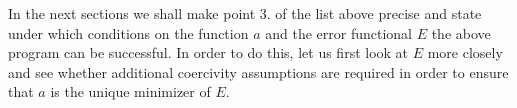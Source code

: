 \documentclass[A4paper,11pt]{article}
\theoremstyle{definition}
\newcommand{\R}{\mathbb{R}}
\DeclareMathOperator{\argmin}{arg\,min}
\begin{document}
In the next sections we shall make point 3. of the list above precise and state under which conditions on the function $a$ and the error functional $E$ the above program can be successful.
%
%
In order to do this, let us first look at $E$ more closely and see whether additional coercivity assumptions are required in order to ensure that $a$ is the unique minimizer of $E$.
\end{document}
